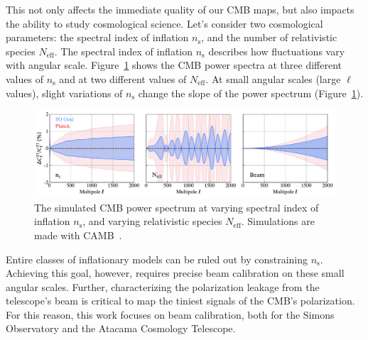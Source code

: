 This not only affects the immediate quality of our CMB maps, but also impacts the ability to study cosmological science.  Let's consider two cosmological parameters: the spectral index of inflation $n_{\text{s}}$, and the number of relativistic species $N_{\text{eff}}$.  The spectral index of inflation $n_{\text{s}}$ describes how fluctuations vary with angular scale.  Figure~\ref{fig:cmb_ns} shows the CMB power spectra at three different values of $n_{\text{s}}$ and at two different values of $N_{\text{eff}}$.  At small angular scales (large $\ell$ values), slight variations of $n_{\text{s}}$ change the slope of the power spectrum (Figure~\ref{fig:cmb_ns}).

\begin{figure}[t!]
    \centering
    \includegraphics[width = \textwidth]{Figures/beam_neff.pdf}
    \caption{The simulated CMB power spectrum at varying spectral index of inflation $n_\text{s}$, and varying relativistic species $N_{\text{eff}}$.  Simulations are made with CAMB~\cite{camb_online}.}
    \label{fig:cmb_ns}
\end{figure}

Entire classes of inflationary models can be ruled out by constraining $n_{\text{s}}$.  Achieving this goal, however, requires precise beam calibration on these small angular scales.  Further, characterizing the polarization leakage from the telescope's beam is critical to map the tiniest signals of the CMB's polarization.  For this reason, this work focuses on beam calibration, both for the Simons Observatory and the Atacama Cosmology Telescope.

